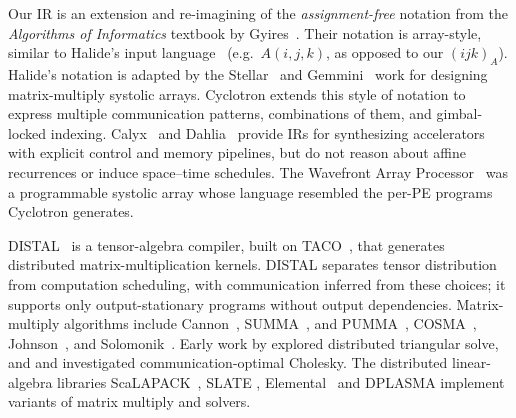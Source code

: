 \documentclass[sigplan, nonacm]{acmart}
\begin{document}
Our IR is an extension and re-imagining of the \emph{assignment-free} notation from the \emph{Algorithms of Informatics} textbook by Gyires~\citep{gyires_systolic}. Their notation is array-style, similar to Halide's input language~\citep{ragan2013halide} (e.g.\ $A(i,j,k)$, as opposed to our $(ijk)_{A}$). Halide's notation is adapted by the Stellar~\citep{genc2024stellar} and Gemmini~\citep{genc2021gemmini} work for designing matrix-multiply systolic arrays. Cyclotron extends this style of notation to express multiple communication patterns, combinations of them, and gimbal-locked indexing. Calyx~\citep{nigam2021calyx} and Dahlia~\citep{nigam2020dahlia} provide IRs for synthesizing accelerators with explicit control and memory pipelines, but do not reason about affine recurrences or induce space--time schedules. The Wavefront Array Processor~\citep{wavefrontLanguage} was a programmable systolic array whose language resembled the per-PE programs Cyclotron generates.

DISTAL~\citep{distal} is a tensor-algebra compiler, built on TACO~\citep{kjolstad2017taco}, that generates distributed matrix-multiplication kernels. DISTAL separates tensor distribution from computation scheduling, with communication inferred from these choices; it supports only output-stationary programs without output dependencies. Matrix-multiply algorithms include Cannon~\citep{cannon1969cellular}, SUMMA~\citep{van1997summa}, and PUMMA~\citep{choi1994pumma}, COSMA~\citep{kwasniewski2019cosma}, Johnson~\citep{johnsonsalg}, and Solomonik~\citep{solomonik2011communication}. Early work by \citep{heathTriangular} explored distributed triangular solve, and \citep{kwasniewski2021costa} and \citep{ballard2009cholesky} investigated communication-optimal Cholesky. The distributed linear-algebra libraries ScaLAPACK~\citep{choi1992scalapack}, SLATE \citep{gates2019slate}, Elemental~\citep{poulson2013elemental} and DPLASMA \citep{bosilca2011flexible,bosilca2013parsec} implement variants of matrix multiply and solvers.


\end{document}
